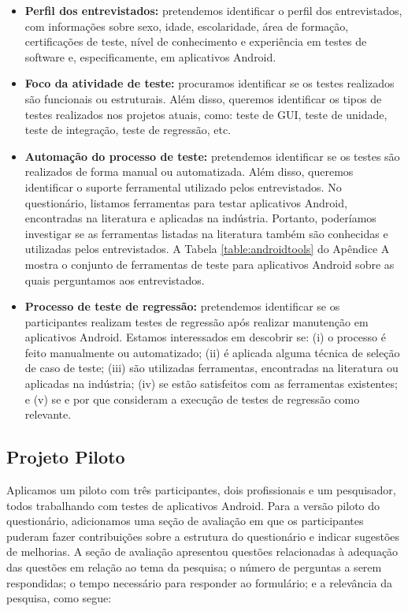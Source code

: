 \begin{itemize}
    \item \textbf{Perfil dos entrevistados:} pretendemos identificar o perfil dos entrevistados, com informações sobre sexo, idade, escolaridade, área de formação, certificações de teste, nível de conhecimento e experiência em testes de software e, especificamente, em aplicativos Android.
    
    \item \textbf{Foco da atividade de teste:} procuramos identificar se os testes realizados são funcionais ou estruturais. Além disso, queremos identificar os tipos de testes realizados nos projetos atuais, como: teste de \ac{GUI}, teste de unidade, teste de integração, teste de regressão, etc.
    
    \item \textbf{Automação do processo de teste:} pretendemos identificar se os testes são realizados de forma manual ou automatizada. Além disso, queremos identificar o suporte ferramental utilizado pelos entrevistados. No questionário, listamos ferramentas para testar aplicativos Android, encontradas na literatura e aplicadas na indústria. Portanto, poderíamos investigar se as ferramentas listadas na literatura também são conhecidas e utilizadas pelos entrevistados. A Tabela \ref{table:androidtools} do Apêndice A mostra o conjunto de ferramentas de teste para aplicativos Android sobre as quais perguntamos aos entrevistados.
    
    \item \textbf{Processo de teste de regressão:} pretendemos identificar se os participantes realizam testes de regressão após realizar manutenção em aplicativos Android. Estamos interessados em descobrir se: (i) o processo é feito manualmente ou automatizado; (ii) é aplicada alguma técnica de seleção de caso de teste; (iii) são utilizadas ferramentas, encontradas na literatura ou aplicadas na indústria; (iv) se estão satisfeitos com as ferramentas existentes; e (v) se e por que consideram a execução de testes de regressão como relevante.
    
\end{itemize}

\subsection{Projeto Piloto}

Aplicamos um piloto com três participantes, dois profissionais e um pesquisador, todos trabalhando com testes de aplicativos Android. Para a versão piloto do questionário, adicionamos uma seção de avaliação em que os participantes puderam fazer contribuições sobre a estrutura do questionário e indicar sugestões de melhorias. A seção de avaliação apresentou questões relacionadas à adequação das questões em relação ao tema da pesquisa; o número de perguntas a serem respondidas; o tempo necessário para responder ao formulário; e a relevância da pesquisa, como segue:


